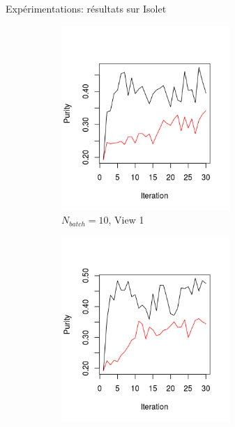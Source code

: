 \documentclass[hyperref={pdfpagelabels=false}]{beamer}
\begin{document}
        \begin{frame}{Expérimentations: résultats sur Isolet}
            \begin{figure}[!h]
                \centering
                \caption{Évolution des puretés pour Isolet.  Les lignes rouges représentes les SOM incrémentales tandis que les lignes noires représentent les SOM incrémentales collaboratives.  Chaque itération correspond à l'arrivée d'une nouvelle donnée}
                \begin{subfigure}[b]{0.3\textwidth}
                    \centering
                    \includegraphics[width=0.7\textwidth, trim= 0cm 0.5cm 1cm 2cm, clip]{img/11.png}
                    \caption{$N_{batch}=10$, View 1}
                \end{subfigure}
                \begin{subfigure}[b]{0.3\textwidth}
                    \centering
                    \includegraphics[width=0.7\textwidth, trim= 0cm 0.5cm 1cm 1.73cm, clip]{img/22.png}

\end{subfigure}
\end{figure}
\end{frame}
\end{document}
